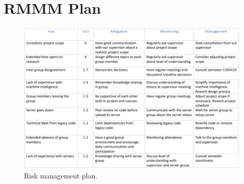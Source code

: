 \chapter{RMMM Plan} \label{app:B}
\begin{figure}[htbp]
    \centering
    \includegraphics[scale=.635, angle=90]{Pictures/Sprint_1/RMM.png}
    \caption{Risk management plan.}
    \label{fig:my_label}
\end{figure}